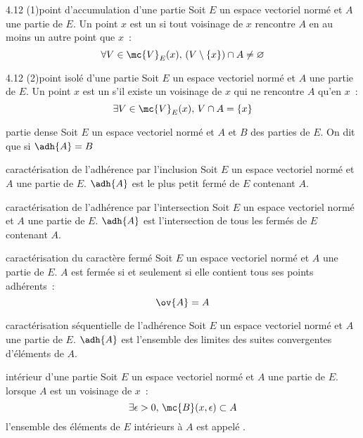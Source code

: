 \begin{adjustwidth}{-3cm}{-3cm}
\begin{definition}{4.12 (1)}{point d'accumulation d'une partie}
    Soit $E$ un espace vectoriel normé et $A$ une partie de $E$. Un point $x$ est un  si tout voisinage de $x$ rencontre $A$ en au moins un autre point que $x$~:
    $$\forall V \in \mc{V}_E(x),\, (V\setminus\{x\}) \cap A \neq \varnothing$$
\end{definition}

\begin{definition}{4.12 (2)}{point isolé d'une partie}
    Soit $E$ un espace vectoriel normé et $A$ une partie de $E$. Un point $x$ est un  s'il existe un voisinage de $x$ qui ne rencontre $A$ qu'en $x$~:
    $$\exists V \in \mc{V}_E(x),\, V \cap A = \{x\}$$
\end{definition}

\begin{definition}{4.15}{partie dense}
    Soit $E$ un espace vectoriel normé et $A$ et $B$ des parties de $E$. On dit que  si $\adh{A} = B$
\end{definition} 

\begin{theoreme}{4.17}{caractérisation de l'adhérence par l'inclusion}
    Soit $E$ un espace vectoriel normé et $A$ une partie de $E$. $\adh{A}$ est le plus petit fermé de $E$ contenant $A$.
\end{theoreme}

\begin{theoreme}{4.18}{caractérisation de l'adhérence par l'intersection}
    Soit $E$ un espace vectoriel normé et $A$ une partie de $E$. $\adh{A}$ est l'intersection de tous les fermés de $E$ contenant $A$.
\end{theoreme}

\begin{theoreme}{4.19}{caractérisation du caractère fermé}
    Soit $E$ un espace vectoriel normé et $A$ une partie de $E$. $A$ est fermée si et seulement si elle contient tous ses points adhérents~:
    $$\ov{A} = A$$
\end{theoreme}

\begin{theoreme}{4.20}{caractérisation séquentielle de l'adhérence}
    Soit $E$ un espace vectoriel normé et $A$ une partie de $E$. $\adh{A}$ est l'ensemble des limites des suites convergentes d'éléments de $A$.
\end{theoreme}

\begin{definition}{4.22}{intérieur d'une partie}
    Soit $E$ un espace vectoriel normé et $A$ une partie de $E$.  lorsque $A$ est un voisinage de $x$~:
    $$\exists \epsilon >0,\, \mc{B}(x,\epsilon) \subset A$$
    l'ensemble des éléments de $E$ intérieurs à $A$ est appelé .
\end{definition}


\end{adjustwidth}
